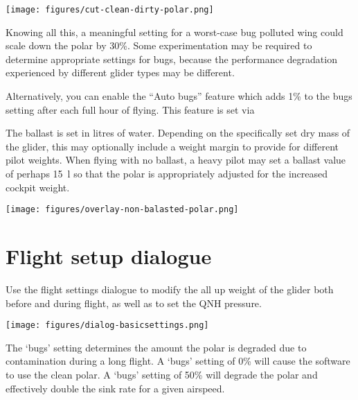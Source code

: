 \begin{center}
\texttt{[image: figures/cut-clean-dirty-polar.png]}
\end{center}
Knowing all this, a meaningful setting for a worst-case bug polluted wing could
scale down the polar by 30\%. Some experimentation may be required to determine 
appropriate settings for bugs, because the performance degradation experienced 
by different glider types may be different.

Alternatively, you can enable the ``Auto bugs'' feature which adds 1\% to the
bugs setting after each full hour of flying.   This feature is set via

\blink{}\blink{}\blink{}\blink{}

The ballast is set in litres of water. 
Depending on the specifically set dry mass of the glider, this may optionally 
include a weight margin to provide for different pilot weights.
  When flying with no ballast, a heavy pilot
may set a ballast value of perhaps 15~l so that the polar is
appropriately adjusted for the increased cockpit weight.

\begin{center}
\texttt{[image: figures/overlay-non-balasted-polar.png]}
\end{center}


\section{Flight setup dialogue}\label{sec:flight-setup}
Use the flight settings dialogue to modify the all up weight of the glider both
before and during flight, as well as to set the QNH pressure.  

\begin{center}
\texttt{[image: figures/dialog-basicsettings.png]}
\end{center}

The `bugs' setting determines the amount the polar is degraded
due to contamination during a long flight.  A `bugs' setting of 0\%
will cause the software to use the clean polar. A `bugs' setting of
50\% will degrade the polar and effectively double the sink
rate for a given airspeed.

